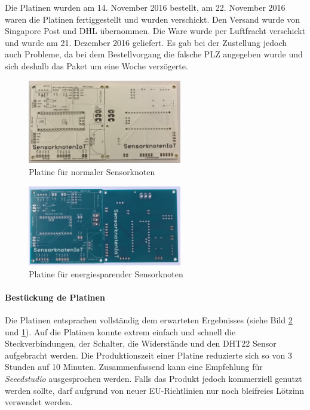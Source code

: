 Die Platinen wurden am 14. November 2016 bestellt, am 22. November 2016 waren die Platinen fertiggestellt und wurden verschickt. Den Versand wurde von Singapore Post und DHL übernommen. Die Ware wurde per Luftfracht verschickt und wurde am 21. Dezember 2016 geliefert. Es gab bei der Zustellung jedoch auch Probleme, da bei dem Bestellvorgang die falsche PLZ angegeben wurde und sich deshalb das Paket um eine Woche verzögerte.
\begin{figure}
	\centering
	\includegraphics[width=0.6\textwidth]{bilder/platineArduinoNano}
	\caption{Platine für normaler Sensorknoten}
	\label{img:PlatineArduinoNano}
\end{figure}
\begin{figure}
	\centering
	\includegraphics[width=0.6\textwidth]{bilder/platineArduinoProMini}
	\caption{Platine für energiesparender Sensorknoten}
	\label{img:PlatineArduinoProMini}
\end{figure}

\paragraph{Bestückung de Platinen} Die Platinen entsprachen vollständig dem erwarteten Ergebnisses (siehe Bild \ref{img:PlatineArduinoProMini} und \ref{img:PlatineArduinoNano}). Auf die Platinen konnte extrem einfach und schnell die Steckverbindungen, der Schalter, die Widerstände und den DHT22 Sensor aufgebracht werden. Die Produktionszeit einer Platine reduzierte sich so von 3 Stunden auf 10 Minuten. Zusammenfassend kann eine Empfehlung für \textit{Seeedstudio} ausgesprochen werden. Falls das Produkt jedoch kommerziell genutzt werden sollte, darf aufgrund von neuer EU-Richtlinien nur noch bleifreies Lötzinn verwendet werden. 
